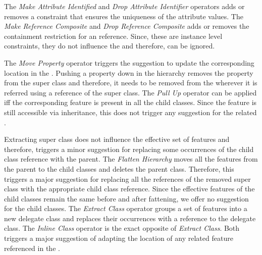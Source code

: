The \textit{Make Attribute Identified} and \textit{Drop Attribute Identifier} operators adds or removes a constraint that ensures the uniqueness of the attribute values. The \textit{Make Reference Composite} and \textit{Drop Reference Composite} adds or removes the containment restriction for an reference. Since, these are instance level constraints, they do not influence the \viewtype and therefore, can be ignored.

The \textit{Move Property} operator triggers the suggestion to update the corresponding location in the \viewtype. Pushing a property down in the hierarchy removes the property from the super class and therefore, it needs to be removed from the \viewtype wherever it is referred using a reference of the super class. The \textit{Pull Up} operator can be applied iff the corresponding feature is present in all the child classes. Since the feature is still accessible via inheritance, this does not trigger any suggestion for the related \viewtypes.

Extracting super class does not influence the effective set of features and therefore, triggers a minor suggestion for replacing some occurrences of the child class reference with the parent. The \textit{Flatten Hierarchy} moves all the features from the parent to the child classes and deletes the parent class. Therefore, this triggers a major suggestion for replacing all the references of the removed super class with the appropriate child class reference. Since the effective features of the child classes remain the same before and after fattening, we offer no suggestion for the child classes. The \textit{Extract Class} operator groups a set of features into a new delegate class and replaces their occurrences with a reference to the delegate class. The \textit{Inline Class} operator is the exact opposite of \textit{Extract Class}. Both triggers a major suggestion of adapting the location of any related feature referenced in the \viewtype.

